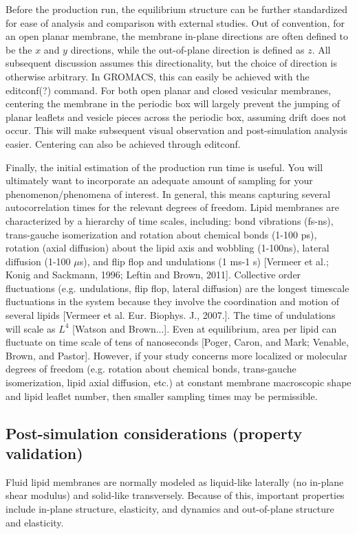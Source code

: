 \documentclass[9pt,bestpractices]{livecoms}
\begin{document}
Before the production run, the equilibrium structure can be further standardized for ease of analysis and comparison with external studies.
Out of convention, for an open planar membrane, the membrane in-plane directions are often defined to be the $x$ and $y$ directions, while the out-of-plane direction is defined as $z$.
All subsequent discussion assumes this directionality, but the choice of direction is otherwise arbitrary.
In GROMACS, this can easily be achieved with the editconf(?) command.
For both open planar and closed vesicular membranes, centering the membrane in the periodic box will largely prevent the jumping of planar leaflets and vesicle pieces across the periodic box, assuming drift does not occur.
This will make subsequent visual observation and post-simulation analysis easier.
Centering can also be achieved through editconf.

Finally, the initial estimation of the production run time is useful.
You will ultimately want to incorporate an adequate amount of sampling for your phenomenon/phenomena of interest.
In general, this means capturing several autocorrelation times for the relevant degrees of freedom.
Lipid membranes are characterized by a hierarchy of time scales, including: bond vibrations (fs-ns), trans-gauche isomerization and rotation about chemical bonds (1-100 ps), rotation (axial diffusion) about the lipid axis and wobbling (1-100ns), lateral diffusion (1-100 $\mu$s), and flip flop and undulations (1 ms-1 s) [Vermeer et al.; Konig and Sackmann, 1996; Leftin and Brown, 2011].
Collective order fluctuations (e.g. undulations, flip flop, lateral diffusion) are the longest timescale fluctuations in the system because they involve the coordination and motion of several lipids [Vermeer et al. Eur. Biophys. J., 2007.].
The time of undulations will scale as $L^4$ [Watson and Brown...].
Even at equilibrium, area per lipid can fluctuate on time scale of tens of nanoseconds [Poger, Caron, and Mark; Venable, Brown, and Pastor].
However, if your study concerns more localized or molecular degrees of freedom (e.g. rotation about chemical bonds, trans-gauche isomerization, lipid axial diffusion, etc.) at constant membrane macroscopic shape and lipid leaflet number, then smaller sampling times may be permissible.

\subsection{Post-simulation considerations (property validation)}
Fluid lipid membranes are normally modeled as liquid-like laterally (no in-plane shear modulus) and solid-like transversely.
Because of this, important properties include in-plane structure, elasticity, and dynamics and out-of-plane structure and elasticity.
\end{document}
